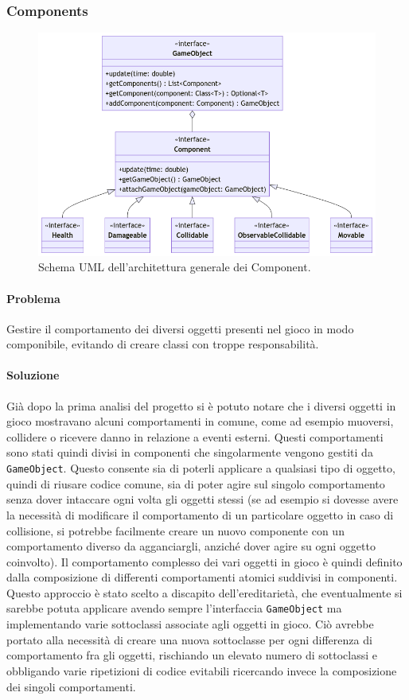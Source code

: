 \documentclass[a4paper,12pt]{report}
\begin{document}
\subsubsection*{Components}
%
\begin{figure}[H]
    \centering{}
    \includegraphics[width=\textwidth]{img/Components.png}
    \caption{Schema UML dell'architettura generale dei Component.}
\end{figure}
%
\paragraph*{Problema}
Gestire il comportamento dei diversi oggetti presenti nel gioco in modo componibile, evitando di creare classi con troppe responsabilità.
\paragraph*{Soluzione}
Già dopo la prima analisi del progetto si è potuto notare che i diversi oggetti in gioco mostravano alcuni comportamenti in comune, come ad esempio muoversi, collidere o ricevere danno in relazione a eventi esterni.
Questi comportamenti sono stati quindi divisi in componenti che singolarmente vengono gestiti da \texttt{GameObject}.
Questo consente sia di poterli applicare a qualsiasi tipo di oggetto, quindi di riusare codice comune, sia di poter agire sul singolo comportamento senza dover intaccare ogni volta gli oggetti stessi (se ad esempio si dovesse avere la necessità di modificare il comportamento di un particolare oggetto in caso di collisione, si potrebbe facilmente creare un nuovo componente con un comportamento diverso da agganciargli, anziché dover agire su ogni oggetto coinvolto).
Il comportamento complesso dei vari oggetti in gioco è quindi definito dalla composizione di differenti comportamenti atomici suddivisi in componenti.
Questo approccio è stato scelto a discapito dell'ereditarietà, che eventualmente si sarebbe potuta applicare avendo sempre l'interfaccia \texttt{GameObject} ma implementando varie sottoclassi associate agli oggetti in gioco. Ciò avrebbe portato alla necessità di creare una nuova sottoclasse per ogni differenza di comportamento fra gli oggetti, rischiando un elevato numero di sottoclassi e obbligando varie ripetizioni di codice evitabili ricercando invece la composizione dei singoli comportamenti.
\end{document}
